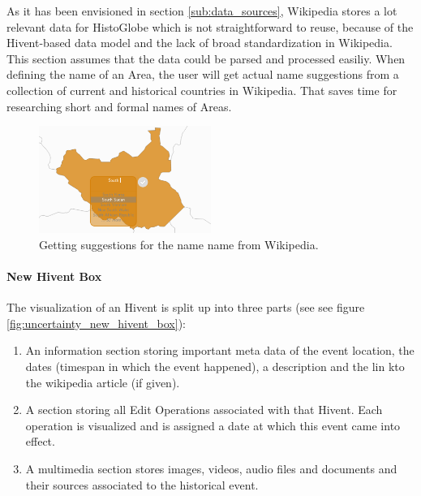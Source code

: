 As it has been envisioned in section \ref{sub:data_sources}, Wikipedia stores a lot relevant data for HistoGlobe which is not straightforward to reuse, because of the Hivent-based data model and the lack of broad standardization in Wikipedia. This section assumes that the data could be parsed and processed easiliy. When defining the name of an Area, the user will get actual name suggestions from a collection of current and historical countries in Wikipedia. That saves time for researching short and formal names of Areas.

\begin{figure}[H]
  \centering
  \includegraphics[width=0.5\textwidth]{graphics/extensions/new_name_tool}
  \caption{Getting suggestions for the name name from Wikipedia.}
  \label{fig:uncertainty_new_name_tool}
\end{figure}

\newpage
\paragraph{New Hivent Box} %
\label{par:new_hivent_box}

The visualization of an Hivent is split up into three parts (see see figure \ref{fig:uncertainty_new_hivent_box}):

\begin{enumerate}
  \item An information section storing important meta data of the event location, the dates (timespan in which the event happened), a description and the lin kto the wikipedia article (if given).
  \item A section storing all Edit Operations associated with that Hivent. Each operation is visualized and is assigned a date at which this event came into effect.
  \item A multimedia section stores images, videos, audio files and documents and their sources associated to the historical event.
\end{enumerate}

